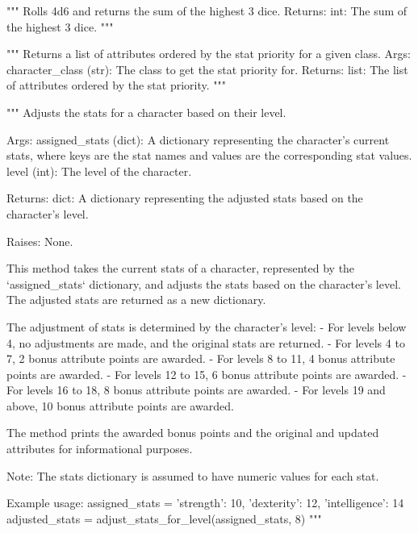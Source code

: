 \begin{codebox}
"""
Rolls 4d6 and returns the sum of the highest 3 dice.
Returns:
    int: The sum of the highest 3 dice.
"""
\end{codebox}

\begin{codebox}
"""
Returns a list of attributes ordered by the stat priority for a given class.
Args:
    character_class (str): The class to get the stat priority for.
Returns:
    list: The list of attributes ordered by the stat priority.
"""
\end{codebox}

\begin{codebox}
"""
Adjusts the stats for a character based on their level.

Args:
    assigned_stats (dict): A dictionary representing the character's current stats, where keys are
        the stat names and values are the corresponding stat values.
    level (int): The level of the character.

Returns:
    dict: A dictionary representing the adjusted stats based on the character's level.

Raises:
    None.

This method takes the current stats of a character, represented by the `assigned_stats` dictionary,
and adjusts the stats based on the character's level. The adjusted stats are returned as a new dictionary.

The adjustment of stats is determined by the character's level:
 - For levels below 4, no adjustments are made, and the original stats are returned.
 - For levels 4 to 7, 2 bonus attribute points are awarded.
 - For levels 8 to 11, 4 bonus attribute points are awarded.
 - For levels 12 to 15, 6 bonus attribute points are awarded.
 - For levels 16 to 18, 8 bonus attribute points are awarded.
 - For levels 19 and above, 10 bonus attribute points are awarded.

The method prints the awarded bonus points and the original and updated attributes for informational purposes.

Note: The stats dictionary is assumed to have numeric values for each stat.

Example usage:
    assigned_stats = {'strength': 10, 'dexterity': 12, 'intelligence': 14}
    adjusted_stats = adjust_stats_for_level(assigned_stats, 8)
"""
\end{codebox}

